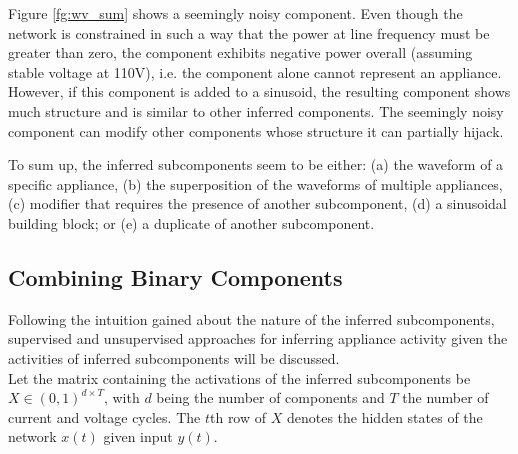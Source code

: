 Figure \ref{fg:wv_sum} shows a seemingly noisy component. Even though the network is constrained in such a way that the power at line frequency must be greater than zero, the component exhibits negative power overall (assuming stable voltage at 110V), i.e. the component alone cannot represent an appliance. However, if this component is added to a sinusoid, the resulting component shows much structure and is similar to other inferred components. The seemingly noisy component can modify other components whose structure it can partially hijack. %

To sum up, the inferred subcomponents seem to be either: (a) the waveform of a specific appliance, (b) the superposition of the waveforms of multiple appliances, (c) modifier that requires the presence of another subcomponent, (d) a sinusoidal building block; or (e) a duplicate of another subcomponent.

\subsection{Combining Binary Components}
Following the intuition gained about the nature of the inferred subcomponents, supervised and unsupervised approaches for inferring appliance activity given the activities of inferred subcomponents will be discussed.\\
Let the matrix containing the activations of the inferred subcomponents be $X \in (0,1)^{d \times T}$, with $d$ being the number of components and $T$ the number of current and voltage cycles. The $t$th row of $X$ denotes the hidden states of the network $x(t)$ given input $y(t)$.

